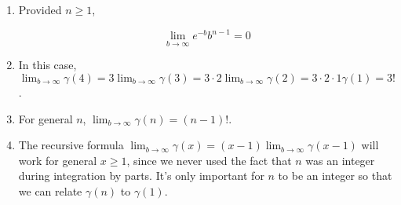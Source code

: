 \begin{enumerate}
\begin{enumerate}
    \item Provided $n\geq 1$,

    \[\lim_{b\to \infty} e^{-b}b^{n-1} = 0\]

    
    \item In this case, $\lim_{b\to \infty} \gamma(4) = 3\lim_{b\to \infty}\gamma(3) = 3\cdot 2 \lim_{b\to \infty}\gamma(2) = 3\cdot 2 \cdot 1 \gamma(1) = 3!$. 

    \item For general $n$, $\lim_{b\to \infty}\gamma(n) = (n-1)!$.

    \item The recursive formula $\lim_{b\to \infty}\gamma(x) = (x-1)\lim_{b\to \infty}\gamma(x-1)$ will work for general $x \geq 1$, since we never used the fact that $n$ was an integer during integration by parts. It's only important for $n$ to be an integer so that we can relate $\gamma(n)$ to $\gamma(1)$. 

    
\end{enumerate}



\end{enumerate}
